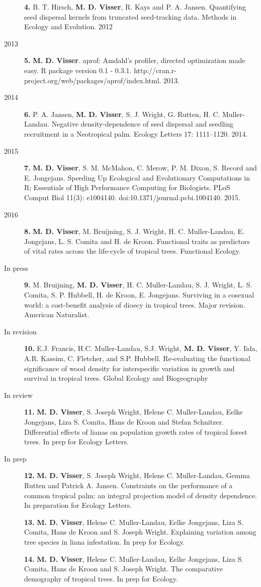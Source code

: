 \begin{description}
\textbf{4.} B. T. Hirsch, \textbf{M. D. Visser}, R. Kays and P. A.
Jansen. Quantifying seed dispersal kernels from truncated seed-tracking
data. Methods in Ecology and Evolution. 2012
\item[2013]
\textbf{5.} \textbf{M. D. Visser}. aprof: Amdahl's profiler, directed
optimization made easy. R package version 0.1 - 0.3.1.
http://cran.r-project.org/web/packages/aprof/index.html. 2013.
\item[2014]
\textbf{6.} P. A. Jansen, \textbf{M. D. Visser}, S. J. Wright, G.
Rutten, H. C. Muller-Landau. Negative density-dependence of seed
dispersal and seedling recruitment in a Neotropical palm. Ecology
Letters 17: 1111--1120. 2014.
\item[2015]
\textbf{7.} \textbf{M. D. Visser}, S. M. McMahon, C. Merow, P. M. Dixon,
S. Record and E. Jongejans. Speeding Up Ecological and Evolutionary
Computations in R; Essentials of High Performance Computing for
Biologists. PLoS Comput Biol 11(3): e1004140.
doi:10.1371/journal.pcbi.1004140. 2015.
\item[2016]
\textbf{8.} \textbf{M. D. Visser}, M. Bruijning, S. J. Wright, H. C.
Muller-Landau, E. Jongejans, L. S. Comita and H. de Kroon. Functional
traits as predictors of vital rates across the life-cycle of tropical
trees. Functional Ecology.
\item[In press]
\textbf{9.} M. Bruijning, \textbf{M. D. Visser}, H. C. Muller-Landau, S.
J. Wright, L. S. Comita, S. P. Hubbell, H. de Kroon, E. Jongejans.
Surviving in a cosexual world: a cost-benefit analysis of dioecy in
tropical trees. Major revision. American Naturalist.
\item[In revision]
\textbf{10.} E.J. Francis, H.C. Muller-Landau, S.J. Wright, \textbf{M.
D. Visser}, Y. Iida, A.R. Kassim, C. Fletcher, and S.P. Hubbell.
Re-evaluating the functional significance of wood density for
interspecific variation in growth and survival in tropical trees. Global
Ecology and Biogeography
\item[In review]
\textbf{11.} \textbf{M. D. Visser}, S. Joseph Wright, Helene C.
Muller-Landau, Eelke Jongejans, Liza S. Comita, Hans de Kroon and Stefan
Schnitzer. Differential effects of lianas on population growth rates of
tropical forest trees. In prep for Ecology Letters.
\item[In prep]
\textbf{12.} \textbf{M. D. Visser}, S. Joseph Wright, Helene C.
Muller-Landau, Gemma Rutten and Patrick A. Jansen. Constraints on the
performance of a common tropical palm: an integral projection model of
density dependence. In preparation for Ecology Letters.

\textbf{13.} \textbf{M. D. Visser}, Helene C. Muller-Landau, Eelke
Jongejans, Liza S. Comita, Hans de Kroon and S. Joseph Wright.
Explaining variation among tree species in liana infestation. In prep
for Ecology.

\textbf{14.} \textbf{M. D. Visser}, Helene C. Muller-Landau, Eelke
Jongejans, Liza S. Comita, Hans de Kroon and S. Joseph Wright. The
comparative demography of tropical trees. In prep for Ecology.
\end{description}


